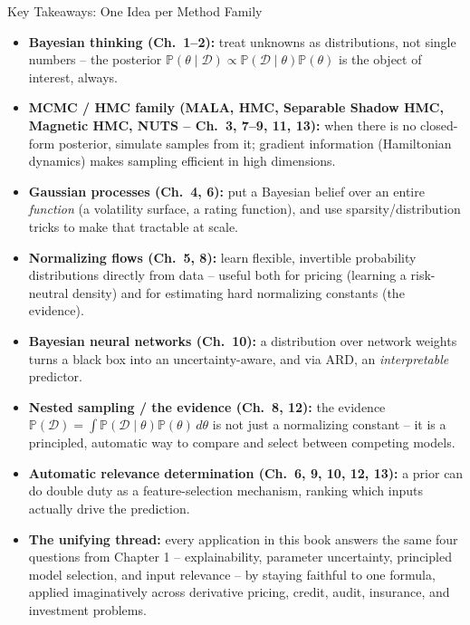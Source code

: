 \documentclass[aspectratio=169,10pt]{beamer}
\newcommand{\Prob}{\mathbb{P}}
\newcommand{\thetav}{\theta}
\newcommand{\Data}{\mathcal{D}}
\begin{document}
\begin{frame}[allowframebreaks]{Key Takeaways: One Idea per Method Family}
  \begin{itemize}
    \item \textbf{Bayesian thinking (Ch.\ 1--2):} treat unknowns as
    distributions, not single numbers -- the posterior
    $\Prob(\thetav\mid\Data)\propto \Prob(\Data\mid\thetav)\Prob(\thetav)$
    is the object of interest, always.
    \item \textbf{MCMC / HMC family (MALA, HMC, Separable Shadow HMC,
    Magnetic HMC, NUTS -- Ch.\ 3, 7--9, 11, 13):} when there is no
    closed-form posterior, simulate samples from it; gradient information
    (Hamiltonian dynamics) makes sampling efficient in high dimensions.
    \item \textbf{Gaussian processes (Ch.\ 4, 6):} put a Bayesian belief
    over an entire \emph{function} (a volatility surface, a rating
    function), and use sparsity/distribution tricks to make that
    tractable at scale.
    \item \textbf{Normalizing flows (Ch.\ 5, 8):} learn flexible,
    invertible probability distributions directly from data -- useful
    both for pricing (learning a risk-neutral density) and for
    estimating hard normalizing constants (the evidence).

    \framebreak

    \item \textbf{Bayesian neural networks (Ch.\ 10):} a distribution
    over network weights turns a black box into an
    uncertainty-aware, and via ARD, an \emph{interpretable} predictor.
    \item \textbf{Nested sampling / the evidence (Ch.\ 8, 12):} the
    evidence $\Prob(\Data)=\int \Prob(\Data\mid\thetav)\Prob(\thetav)\,d\thetav$
    is not just a normalizing constant -- it is a principled,
    automatic way to compare and select between competing models.
    \item \textbf{Automatic relevance determination (Ch.\ 6, 9, 10, 12,
    13):} a prior can do double duty as a feature-selection mechanism,
    ranking which inputs actually drive the prediction.
    \item \textbf{The unifying thread:} every application in this book
    answers the same four questions from Chapter 1 -- explainability,
    parameter uncertainty, principled model selection, and input
    relevance -- by staying faithful to one formula, applied
    imaginatively across derivative pricing, credit, audit, insurance,
    and investment problems.
  \end{itemize}
\end{frame}
\end{document}
